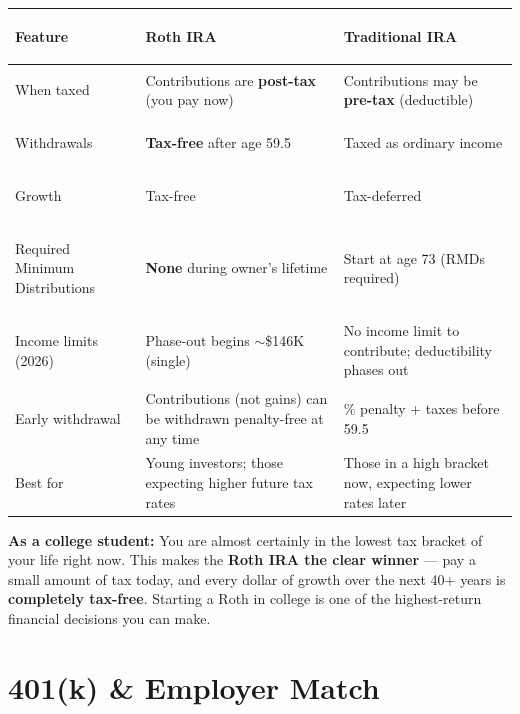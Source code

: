 \documentclass[11pt, letterpaper]{article}
\begin{document}
\noindent
{\renewcommand{\arraystretch}{1.6}
\begin{tabularx}{\textwidth}{>{\bfseries\raggedright\arraybackslash}p{4cm}
                              >{\raggedright\arraybackslash}X
                              >{\raggedright\arraybackslash}X}
\toprule
\rowcolor{tableheader}
\textbf{Feature} & \textbf{Roth IRA} & \textbf{Traditional IRA} \\
\midrule
\rowcolor{rowA}  When taxed          & Contributions are \textbf{post-tax} (you pay now) & Contributions may be \textbf{pre-tax} (deductible) \\
\rowcolor{rowB}  Withdrawals         & \textbf{Tax-free} after age 59.5 & Taxed as ordinary income \\
\rowcolor{rowA}  Growth              & Tax-free & Tax-deferred \\
\rowcolor{rowB}  Required Minimum Distributions & \textbf{None} during owner's lifetime & Start at age 73 (RMDs required) \\
\rowcolor{rowA}  Income limits (2026)& Phase-out begins $\sim$\$146K (single) & No income limit to contribute; deductibility phases out \\
\rowcolor{rowB}  Early withdrawal    & Contributions (not gains) can be withdrawn penalty-free at any time & 10\% penalty + taxes before 59.5 \\
\rowcolor{rowA}  Best for            & Young investors; those expecting higher future tax rates & Those in a high bracket now, expecting lower rates later \\
\bottomrule
\end{tabularx}}

\begin{tcolorbox}[colback=partbg, colframe=sectionblue, arc=3pt, boxrule=1pt]
\textbf{As a college student:} You are almost certainly in the lowest tax bracket of your life right now. This makes the \textbf{Roth IRA the clear winner} --- pay a small amount of tax today, and every dollar of growth over the next 40+ years is \textbf{completely tax-free}. Starting a Roth in college is one of the highest-return financial decisions you can make.
\end{tcolorbox}

\section*{401(k) \& Employer Match}
\end{document}

